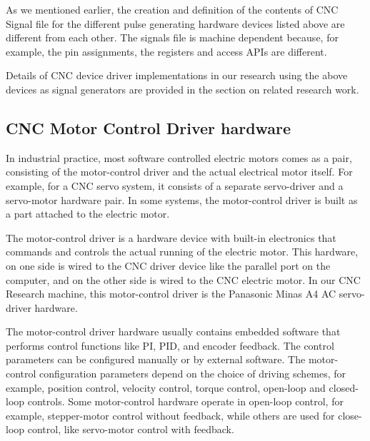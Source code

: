 As we mentioned earlier, the creation and definition of the contents of CNC Signal file for the different pulse generating hardware devices listed above are different from each other. The signals file is machine dependent because, for example, the pin assignments, the registers and access APIs are different.
\vspace*{1\baselineskip}

Details of CNC device driver implementations in our research using the above devices as signal generators are provided in the section on related research work.

\subsection{CNC Motor Control Driver hardware}
	
In industrial practice, most software controlled electric motors comes as a pair, consisting of the motor-control driver and the actual electrical motor itself. For example, for a CNC servo system, it consists of a separate servo-driver and a servo-motor hardware pair. In some systems, the motor-control driver is built as a part attached to the electric motor. 
\vspace*{1\baselineskip}
	
The motor-control driver is a hardware device with built-in electronics that commands and controls the actual running of the electric motor. This hardware, on one side is wired to the CNC driver device like the parallel port on the computer, and on the other side is wired to the CNC electric motor. In our CNC Research machine, this motor-control driver is the Panasonic Minas A4 AC servo-driver hardware.
\vspace*{1\baselineskip}
	
The motor-control driver hardware usually contains embedded software that performs control functions like PI, PID, and encoder feedback. The control parameters can be configured manually or by external software. The motor-control configuration parameters depend on the choice of driving schemes, for example, position control, velocity control, torque control, open-loop and closed-loop controls. Some motor-control hardware operate in open-loop control, for example, stepper-motor control without feedback, while others are used for close-loop control, like servo-motor control with feedback.
\vspace*{1\baselineskip}

